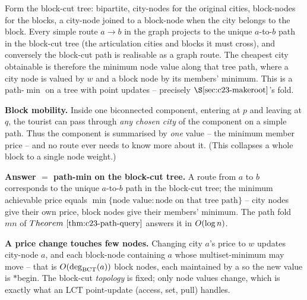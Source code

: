 Form the block-cut tree: bipartite, city-nodes for the original cities, block-nodes for the blocks,
a city-node joined to a block-node when the city belongs to the block. Every simple route \(a\to b\)
in the graph projects to the unique \(a\)-to-\(b\) path in the block-cut tree (the articulation
cities and blocks it must cross), and conversely the block-cut path is realisable as a graph route.
The cheapest city obtainable is therefore the minimum node value along that tree path, where a city
node is valued by \(w\) and a block node by its members' minimum. This is a path-\(\min\) on a tree
with point updates -- precisely \(\secref{c23-makeroot}\)'s fold.

\begin{observation}
\textbf{Block mobility.} Inside one biconnected component, entering at \(p\) and leaving at \(q\),
the tourist can pass through \emph{any chosen city} of the component on a simple path. Thus the
component is summarised by \emph{one} value -- the minimum member price -- and no route ever needs
to know more about it. (This collapses a whole block to a single node weight.)
\end{observation}
\begin{observation}
\textbf{Answer \(=\) path-min on the block-cut tree.} A route from \(a\) to \(b\) corresponds to the
unique \(a\)-to-\(b\) path in the block-cut tree; the minimum achievable price equals
\(\min\{\text{node value} : \text{node on that tree path}\}\) -- city nodes give their own price,
block nodes give their members' minimum. The path fold \(\mathit{mn}\) of \(\thmref{c23-path-query}\)
answers it in \(O(\log n)\).
\end{observation}
\begin{observation}
\textbf{A price change touches few nodes.} Changing city \(a\)'s price to \(w\) updates city-node
\(a\), and each block-node containing \(a\) whose multiset-minimum may move -- that is
\(O(\deg_{\text{BCT}}(a))\) block nodes, each maintained by a  so the new value is
\(*\)begin. The block-cut \emph{topology} is fixed; only node values change, which is exactly what an
LCT point-update (access, set, pull) handles.
\end{observation}

